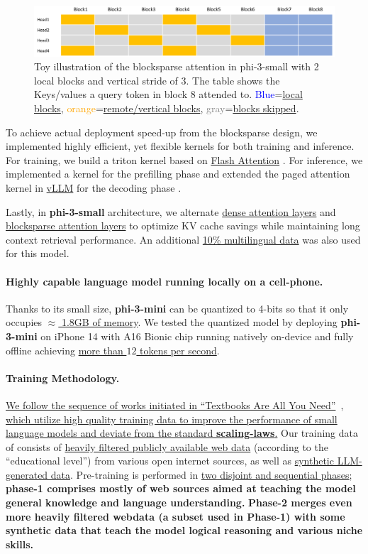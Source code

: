 \documentclass[11pt]{article}
\begin{document}
\begin{figure}[!h]
    \centering
    \includegraphics[scale=0.3]{figures/illustration-of-bs-attn.png}
    \caption{Toy illustration of the blocksparse attention in phi-3-small with 2 local blocks and vertical stride of 3. The table shows the Keys/values a query token in block 8 attended to. \textcolor{blue}{Blue}=\uline{local blocks}, \textcolor{orange}{orange}=\uline{remote/vertical blocks}, \textcolor{gray}{gray}=\uline{blocks skipped}.}
    \label{fig:bs-atn-illustration}
\end{figure}

To achieve actual deployment speed-up from the blocksparse design, we implemented highly efficient, yet flexible kernels for both training and inference. For training, we build a triton kernel based on \uline{Flash Attention} \cite{dao2022flashattention}. For inference, we implemented a kernel for the prefilling phase and extended the paged attention kernel in \uline{vLLM} for the decoding phase \cite{kwon2023efficient}.

Lastly, in \textbf{phi-3-small} architecture, we alternate \uline{dense attention layers} and \uline{blocksparse attention layers} to optimize KV cache savings  while maintaining long context retrieval performance. An additional \uline{10\% multilingual data} was also used for this model.

\paragraph{Highly capable language model running locally on a cell-phone.} Thanks to its small size, \textbf{phi-3-mini} can be quantized to 4-bits so that it only occupies \uline{$\approx$ 1.8GB of memory}. We tested the quantized model by deploying \textbf{phi-3-mini} on iPhone 14 with A16 Bionic chip running natively on-device and fully offline achieving \uline{more than $12$ tokens per second}.

\paragraph{Training Methodology.} \uline{We follow the sequence of works initiated in ``Textbooks Are All You Need''}~\cite{gunasekar2023textbooks}, \uline{which utilize high quality training data to improve the performance of small language models and deviate from the standard {\bf scaling-laws}.} Our training data of consists of \uline{heavily filtered publicly available web data} (according to the ``educational level'') from various open internet sources, as well as \uline{synthetic LLM-generated data}. Pre-training is performed in \uline{two disjoint and sequential phases}; \textbf{phase-1 comprises mostly of web sources aimed at teaching the model general knowledge and language understanding.} \textbf{Phase-2 merges even more heavily filtered webdata (a subset used in Phase-1) with some synthetic data that teach the model logical reasoning and various niche skills.} 
\end{document}
